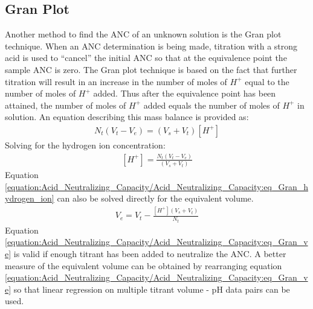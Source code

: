 \documentclass[letterpaper,10pt,english]{sphinxmanual}
\begin{document}
\subsection{Gran Plot}
\label{\detokenize{Acid_Neutralizing_Capacity/Acid_Neutralizing_Capacity:gran-plot}}\label{\detokenize{Acid_Neutralizing_Capacity/Acid_Neutralizing_Capacity:heading-anc-gran-plot}}
Another method to find the ANC of an unknown solution is the Gran plot technique. When an ANC determination is being made, titration with a strong acid is used to “cancel” the initial ANC so that at the equivalence point the sample ANC is zero. The Gran plot technique is based on the fact that further titration will result in an increase in the number of moles of \(H^+\) equal to the number of moles of \(H^+\) added. Thus after the equivalence point has been attained, the number of moles of \(H^+\) added equals the number of moles of \(H^+\) in solution. An equation describing this mass balance is provided as:
\begin{equation}\label{equation:Acid_Neutralizing_Capacity/Acid_Neutralizing_Capacity:eq_Gran_H_balance}
\begin{split} N_{t} \left(V_{t} -V_{e} \right)=\left(V_{s} +V_{t} \right)\left[H^{+} \right]\end{split}
\end{equation}
Solving for the hydrogen ion concentration:
\begin{equation}\label{equation:Acid_Neutralizing_Capacity/Acid_Neutralizing_Capacity:eq_Gran_hydrogen_ion}
\begin{split} \left[H^{+} \right]=\frac{N_{t} \left(V_{t} -V_{e} \right)}{\left(V_{s} +V_{t} \right)}\end{split}
\end{equation}
Equation \eqref{equation:Acid_Neutralizing_Capacity/Acid_Neutralizing_Capacity:eq_Gran_hydrogen_ion} can also be solved directly for the equivalent volume.
\begin{equation}\label{equation:Acid_Neutralizing_Capacity/Acid_Neutralizing_Capacity:eq_Gran_ve}
\begin{split} V_{e} =V_{t} -\frac{\left[H^{+} \right]\left(V_{s} +V_{t} \right)}{N_{t} }\end{split}
\end{equation}
Equation \eqref{equation:Acid_Neutralizing_Capacity/Acid_Neutralizing_Capacity:eq_Gran_ve} is valid if enough titrant has been added to neutralize the ANC. A better measure of the equivalent volume can be obtained by rearranging equation \eqref{equation:Acid_Neutralizing_Capacity/Acid_Neutralizing_Capacity:eq_Gran_ve} so that linear regression on multiple titrant volume - pH data pairs can be used.
\end{document}
